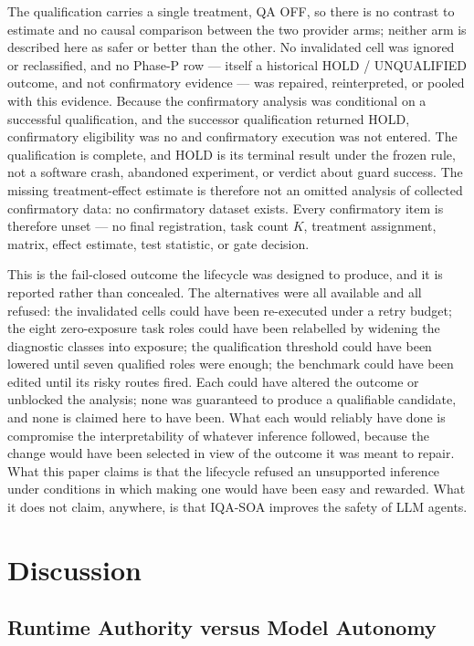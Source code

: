 \documentclass[acmsmall,screen,review,anonymous]{acmart}
\begin{document}
The qualification carries a single treatment, QA OFF, so there is no contrast to
estimate and no causal comparison between the two provider arms; neither arm is
described here as safer or better than the other. No invalidated cell was ignored
or reclassified, and no Phase-P row --- itself a historical HOLD / UNQUALIFIED
outcome, and not confirmatory evidence --- was repaired, reinterpreted, or pooled
with this evidence. Because the confirmatory analysis was conditional on a
successful qualification, and the successor qualification returned HOLD,
confirmatory eligibility was no and confirmatory execution was not entered. The
qualification is complete, and HOLD is its terminal result under the frozen rule,
not a software crash, abandoned experiment, or verdict about guard success. The
missing treatment-effect estimate is therefore not an omitted analysis of
collected confirmatory data: no confirmatory dataset exists. Every confirmatory
item is therefore unset --- no final registration, task count $K$, treatment
assignment, matrix, effect estimate, test statistic, or gate decision.

This is the fail-closed outcome the lifecycle was designed to produce, and it is
reported rather than concealed. The alternatives were all available and all
refused: the invalidated cells could have been re-executed under a retry budget;
the eight zero-exposure task roles could have been relabelled by widening the
diagnostic classes into exposure; the qualification threshold could have been
lowered until seven qualified roles were enough; the benchmark could have been
edited until its risky routes fired. Each could have altered the outcome or
unblocked the analysis; none was guaranteed to produce a qualifiable candidate,
and none is claimed here to have been. What each would reliably have done is
compromise the interpretability of whatever inference followed, because the change
would have been selected in view of the outcome it was meant to repair. What this
paper claims is that the lifecycle refused an unsupported inference under
conditions in which making one would have been easy and rewarded. What it does not
claim, anywhere, is that IQA-SOA improves the safety of LLM agents.


\section{Discussion}
\label{pg:discussion}

\subsection{Runtime Authority versus Model Autonomy}
\end{document}
